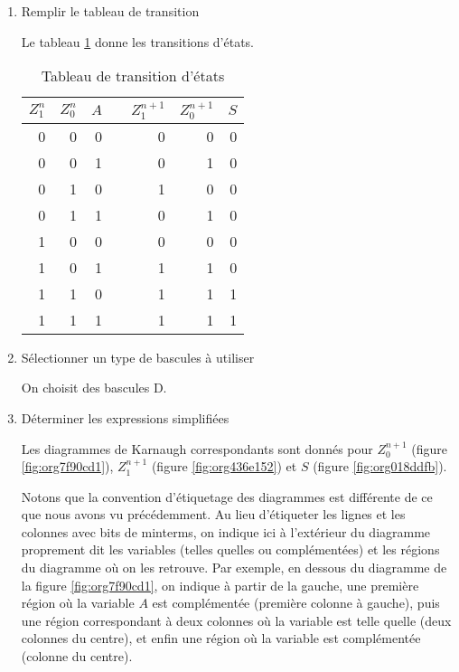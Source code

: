 \documentclass[letter, oneside]{book}
\begin{document}
\begin{enumerate}
\begin{enumerate}
\item Remplir le tableau de transition
\label{sec:org0d86972}

Le tableau \ref{tab:org1f4afc5} donne les transitions d'états. 

\begin{table}[htbp]
\caption{\label{tab:org1f4afc5}Tableau de transition d'états}
\centering
\begin{tabular}{rrrlrrr}
\(Z_1^n\) & \(Z_0^n\) & \(A\) &  & \(Z_1^{n+1}\) & \(Z_0^{n+1}\) & \(S\)\\[0pt]
\hline
0 & 0 & 0 &  & 0 & 0 & 0\\[0pt]
0 & 0 & 1 &  & 0 & 1 & 0\\[0pt]
0 & 1 & 0 &  & 1 & 0 & 0\\[0pt]
0 & 1 & 1 &  & 0 & 1 & 0\\[0pt]
1 & 0 & 0 &  & 0 & 0 & 0\\[0pt]
1 & 0 & 1 &  & 1 & 1 & 0\\[0pt]
1 & 1 & 0 &  & 1 & 1 & 1\\[0pt]
1 & 1 & 1 &  & 1 & 1 & 1\\[0pt]
\end{tabular}
\end{table}


\item Sélectionner un type de bascules à utiliser
\label{sec:org1fd231b}

On choisit des bascules D. 

\item Déterminer les expressions simplifiées
\label{sec:org8d7d8c1}

Les diagrammes de Karnaugh correspondants sont donnés pour
\(Z_0^{n+1}\) (figure \ref{fig:org7f90cd1}), \(Z_1^{n+1}\) (figure
\ref{fig:org436e152}) et \(S\) (figure \ref{fig:org018ddfb}).  

Notons que la convention d'étiquetage des diagrammes est différente de
ce que nous avons vu précédemment.  Au lieu d'étiqueter les lignes et
les colonnes avec bits de minterms, on indique ici à l'extérieur du
diagramme proprement dit les variables (telles quelles ou
complémentées) et les régions du diagramme où on les retrouve. Par
exemple, en dessous du diagramme de la figure \ref{fig:org7f90cd1}, on
indique à partir de la gauche, une première région où la variable
\(A\) est complémentée (première colonne à gauche), puis une région
correspondant à deux colonnes où la variable est telle quelle (deux
colonnes du centre), et enfin une région où la variable est
complémentée (colonne du centre).


\end{enumerate}
\end{enumerate}
\end{document}
